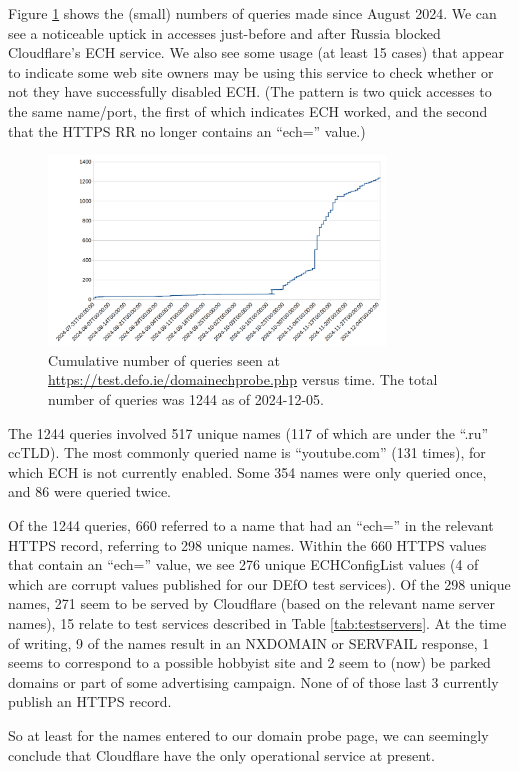 Figure \ref{fig:qtimes} shows the (small) numbers of queries made since August
2024. We can see a noticeable uptick in accesses just-before and after Russia
blocked Cloudflare's ECH service. We also see some usage (at least 15 cases) that
appear to indicate some web site owners may be using this service to check
whether or not they have successfully disabled ECH. (The pattern is two quick
accesses to the same name/port, the first of which indicates ECH worked, and
the second that the HTTPS RR no longer contains an ``ech='' value.)

\begin{figure}
	\centering
	\includegraphics[width=0.8\textwidth,keepaspectratio]{domainprobequeries.png}
		\caption[clustediag]{Cumulative number of queries seen at 
        \url{https://test.defo.ie/domainechprobe.php} versus time. 
        The total number of queries was 1244 as of 2024-12-05.} 
	\label{fig:qtimes}
\end{figure}

The 1244 queries involved 517 unique names (117 of which are under
the ``.ru'' ccTLD). The most commonly queried name is ``youtube.com'' (131 times),
for which ECH is not currently enabled. Some 354 names were only queried 
once, and 86 were queried twice.

Of the 1244 queries, 660 referred to a name that had an ``ech='' in
the relevant HTTPS record, referring to 298 unique names.  Within the 660 HTTPS 
values that contain an ``ech='' value, we see 276 unique ECHConfigList values (4 of which are
corrupt values published for our DEfO test services).  Of the 298 unique
names, 271 seem to be served by Cloudflare (based on the relevant name server
names), 15 relate to test services described in Table \ref{tab:testservers}. At
the time of writing, 9 of the names result in an NXDOMAIN or SERVFAIL
response, 1 seems to correspond to a possible hobbyist site and 2 seem to (now)
be parked domains or part of some advertising campaign. None of of those last
3 currently publish an HTTPS record.

So at least for the names entered to our domain probe page, we can seemingly
conclude that Cloudflare have the only operational service at present.
